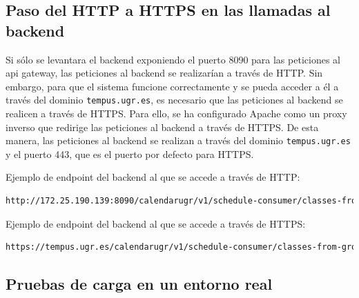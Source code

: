 \subsection{Paso del HTTP a HTTPS en las llamadas al backend}
Si sólo se levantara el backend exponiendo el puerto 8090 para las peticiones al api gateway, las peticiones al backend se realizarían a través de HTTP. Sin embargo, para que el sistema funcione correctamente y se pueda acceder a él a través del dominio \texttt{tempus.ugr.es}, es necesario que las peticiones al backend se realicen a través de HTTPS.
Para ello, se ha configurado Apache como un proxy inverso que redirige las peticiones al backend a través de HTTPS. De esta manera, las peticiones al backend se realizan a través del dominio \texttt{tempus.ugr.es} y el puerto 443, que es el puerto por defecto para HTTPS.

Ejemplo de endpoint del backend al que se accede a través de HTTP:

\lstset{inputencoding=utf8}
\begin{lstlisting}[language=bash]
http://172.25.190.139:8090/calendarugr/v1/schedule-consumer/classes-from-group
\end{lstlisting}

Ejemplo de endpoint del backend al que se accede a través de HTTPS:

\lstset{inputencoding=utf8}
\begin{lstlisting}[language=bash]
https://tempus.ugr.es/calendarugr/v1/schedule-consumer/classes-from-group
\end{lstlisting}

\subsection{Pruebas de carga en un entorno real}



